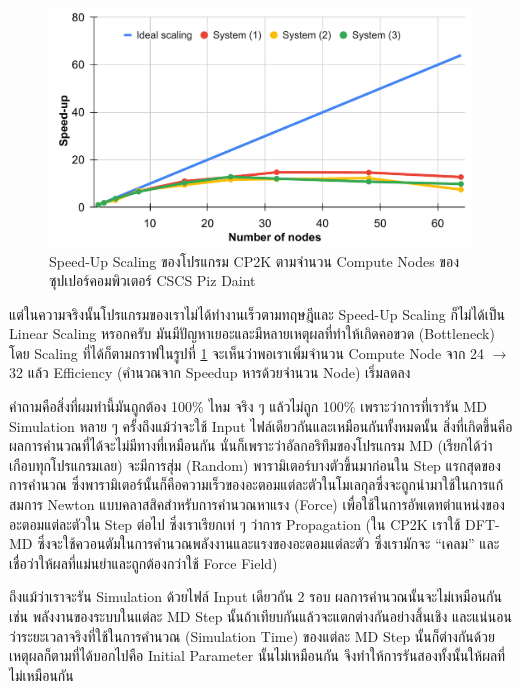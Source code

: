 \begin{figure}[htbp]
  \centering
  \includegraphics[width=0.9\linewidth]{fig/perf-scaling-cp2k.pdf}
  \caption{Speed-Up Scaling ของโปรแกรม CP2K ตามจำนวน Compute Nodes ของซุปเปอร์คอมพิวเตอร์ CSCS Piz Daint}
  \label{fig:perf_scaling_cp2k}
\end{figure}

แต่ในความจริงนั้นโปรแกรมของเราไม่ได้ทำงานเร็วตามทฤษฎีและ Speed-Up Scaling ก็ไม่ได้เป็น Linear Scaling หรอกครับ
มันมีปัญหาเยอะและมีหลายเหตุผลที่ทำให้เกิดคอขวด (Bottleneck) โดย Scaling ที่ได้ก็ตามกราฟในรูปที่ \ref{fig:perf_scaling_cp2k}
จะเห็นว่าพอเราเพิ่มจำนวน Compute Node จาก 24 $\rightarrow$ 32 แล้ว Efficiency (คำนวณจาก Speedup หารด้วยจำนวน Node)
เริ่มลดลง

คำถามคือสิ่งที่ผมทำนี้มันถูกต้อง 100\% ไหม จริง ๆ แล้วไม่ถูก 100\% เพราะว่าการที่เรารัน MD Simulation หลาย ๆ ครั้งถึงแม้ว่าจะใช้ Input
ไฟล์เดียวกันและเหมือนกันทั้งหมดนั้น สิ่งที่เกิดขึ้นคือผลการคำนวณที่ได้จะไม่มีทางที่เหมือนกัน นั่นก็เพราะว่าอัลกอริทึมของโปรแกรม MD
(เรียกได้ว่าเกือบทุกโปรแกรมเลย) จะมีการสุ่ม (Random) พารามิเตอร์บางตัวขึ้นมาก่อนใน Step แรกสุดของการคำนวณ
ซึ่งพารามิเตอร์นั้นก็คือความเร็วของอะตอมแต่ละตัวในโมเลกุลซึ่งจะถูกนำมาใช้ในการแก้สมการ Newton แบบคลาสสิคสำหรับการคำนวณหาแรง (Force)
เพื่อใช้ในการอัพเดทตำแหน่งของอะตอมแต่ละตัวใน Step ต่อไป ซึ่งเราเรียกเท่ ๆ ว่าการ Propagation
(ใน CP2K เราใช้ DFT-MD ซึ่งจะใช้ควอนตัมในการคำนวณพลังงานและแรงของอะตอมแต่ละตัว ซึ่งเรามักจะ \enquote{เคลม}
และเชื่อว่าให้ผลที่แม่นยำและถูกต้องกว่าใช้ Force Field)

ถึงแม้ว่าเราจะรัน Simulation ด้วยไฟล์ Input เดียวกัน 2 รอบ ผลการคำนวณนั้นจะไม่เหมือนกัน เช่น พลังงานของระบบในแต่ละ MD Step
นั้นถ้าเทียบกันแล้วจะแตกต่างกันอย่างสิ้นเชิง และแน่นอนว่าระยะเวลาจริงที่ใช้ในการคำนวณ (Simulation Time) ของแต่ละ MD Step นั้นก็ต่างกันด้วย
เหตุผลก็ตามที่ได้บอกไปคือ Initial Parameter นั้นไม่เหมือนกัน จึงทำให้การรันสองทั้งนั้นให้ผลที่ไม่เหมือนกัน

